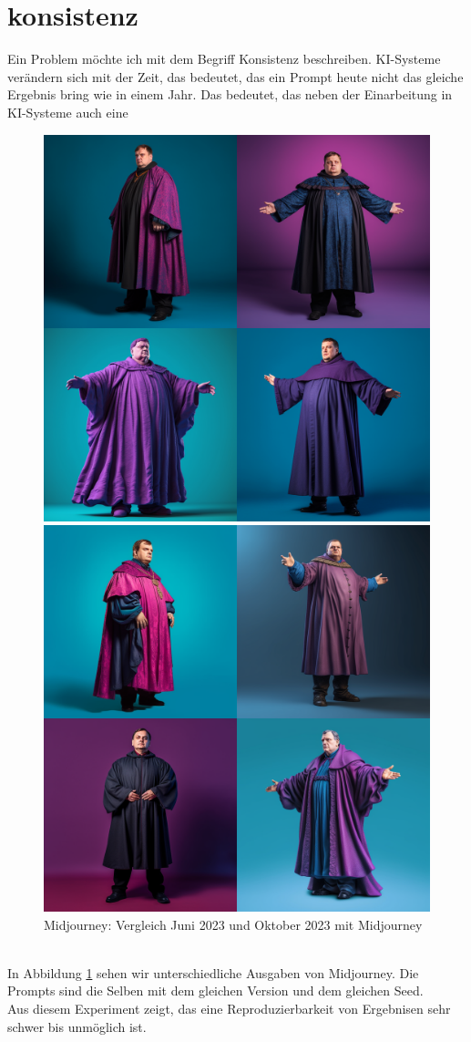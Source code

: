 \section{konsistenz}
Ein Problem möchte ich mit dem Begriff Konsistenz beschreiben.
KI-Systeme verändern sich mit der Zeit, das bedeutet, das ein Prompt heute nicht das gleiche Ergebnis bring wie in einem Jahr.
Das bedeutet, das neben der Einarbeitung in KI-Systeme auch eine
\begin{figure}
	\centering
	\begin{minipage}[t]{0.45\linewidth}
	\centering
	\includegraphics[width=6.405cm\linewidth]{BilderFuerBA/Sonstiges/mlAltSelberSeed}	
	\end{minipage}
	\hfill
	\begin{minipage}[t]{0.45\linewidth}
	\centering
	\includegraphics[width=6.405cm\linewidth]{BilderFuerBA/Sonstiges/mlNeuSelberSeed}
	\end{minipage}
	\caption{Midjourney: Vergleich Juni 2023 und Oktober 2023 mit Midjourney}
	\label{MLaltSelberSeedUndVersion}
\end{figure}
\\
In Abbildung \ref{MLaltSelberSeedUndVersion} sehen wir unterschiedliche Ausgaben von Midjourney. Die Prompts sind die Selben mit dem gleichen Version und dem gleichen Seed.
\\
Aus diesem Experiment zeigt, das eine Reproduzierbarkeit von Ergebnisen sehr schwer bis unmöglich ist.

